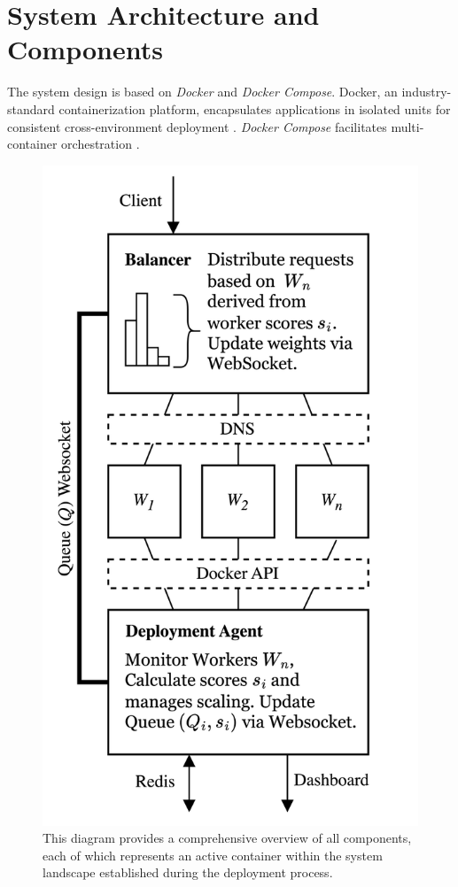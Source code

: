 \documentclass[twocolumn]{webofc}
\begin{document}
\section{System Architecture and Components}
The system design is based on \textit{Docker} and \textit{Docker Compose}. Docker, an industry-standard containerization platform, encapsulates applications in isolated units for consistent cross-environment deployment \cite{docker_overview}. \textit{Docker Compose} facilitates multi-container orchestration \cite{docker_compose}.
\begin{figure}[H]
    \centering
    \includegraphics[width=0.701\columnwidth]{minimaloverview.png}
    \caption{This diagram provides a comprehensive overview of all components, each of which represents an active container within the system landscape established during the deployment process.}
    \label{fig:minimal}
\end{figure}
\end{document}
